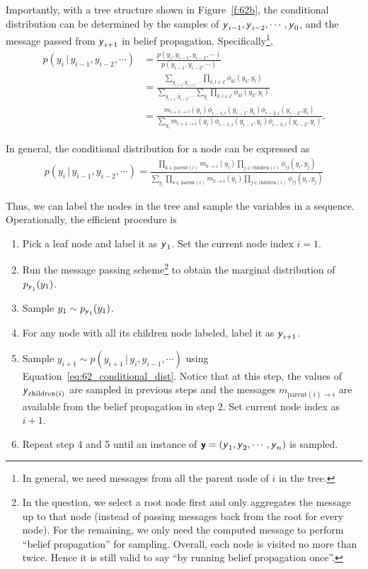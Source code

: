 \documentclass{article}
\newcommand{\s}[1]{\textsf{\textit{#1}}}
\newcommand{\bs}[1]{\textsf{\textbf{#1}}}
\begin{document}
Importantly, with a tree structure shown in Figure~\ref{f:62b}, the conditional
distribution can be determined by the samples of
$\s{y}_{i-1}, \s{y}_{i-2}, \cdots, \s{y}_{0}$, and the message passed from $\s{y}_{i+1}$
in belief propagation. Specifically\footnote{In general, we need messages from all the parent node of $i$ in the tree.},
%
\begin{align*}
	p(y_i \,\big|\, y_{i-1}, y_{i-2}, \cdots) &= \frac{p(y_i, y_{i-1}, y_{i-2}, \cdots)}{p(y_{i-1}, y_{i-2}, \cdots)}\\
	&=\frac{\sum_{y_{i+1}, y_{i+2}, \cdots} \prod_{k, l \in \mathscr{E}} \phi_{kl}(y_k, y_l)}{\sum_{y_{i+1}, y_{i+2}, \cdots}\sum_{y_{i}}\prod_{k, l \in \mathscr{E}}\phi_{kl}(y_k, y_l)} \\ 
	&= \frac{m_{i+1\to i}(y_i) \phi_{i-1, i}(y_{i-1}, y_i)\phi_{i-2, i}(y_{i-2}, y_i)}{\sum_{y_{i}}m_{i+1\to i}(y_i) \phi_{i-1, i}(y_{i-1}, y_i)\phi_{i-2, i}(y_{i-2}, y_i)}.
\end{align*}
%

In general, the conditional distribution for a node can be expressed as
\begin{align}
	p(y_i \,\big|\, y_{i-1}, y_{i-2}, \cdots) = \frac{\prod_{k \in \text{parent}(i)}m_{k\to i}(y_i)\prod_{j \in \text{children}(i)}\phi_{ij}(y_i, y_j)}{\sum_{y_{i}}\prod_{k \in \text{parent}(i)}m_{k\to i}(y_i)\prod_{j \in \text{children}(i)}\phi_{ij}(y_i, y_j)} \label{eq:62_conditional_dist}
\end{align}

Thus, we can label the nodes in the tree and sample the variables in a sequence.
%
Operationally, the efficient procedure is
\begin{enumerate}
	\item Pick a leaf node and label it as $\s{y}_1$. Set the current node index $i=1$.
	\item Run the message passing scheme\footnote{In the question, we select a root node
		  first and only aggregates the message up to that node
		  (instead of passing messages back from the root for every node).
		  For the remaining, we
		  only need the computed message to perform ``belief propagation'' for sampling.
		  Overall, each node is visited no more than twice. Hence it is still valid to say 		  ``by running belief propagation once''.}
		  to obtain the marginal distribution of $p_{\s{y}_1}(y_1)$.
	\item Sample $y_1 \sim p_{\s{y}_1}(y_1)$.
	\item For any node with all its children node labeled, label it as $\s{y}_{i+1}$.
	\item Sample $y_{i+1} \sim p(y_{i+1} \,\big|\, y_i, y_{i-1}, \cdots )$ using
		  Equation~\eqref{eq:62_conditional_dist}. Notice that at this step, the values of
		  $\s{y}_{\text{children}(i)}$ are sampled in previous steps and the messages
		  $m_{\text{parent}(i)\to i}$ are available from the belief propagation in step 2.
		  Set current node index as $i + 1$.
	\item Repeat step 4 and 5 until an instance of $\bs{y} = (\s{y}_1, \s{y}_2, \cdots, 		  \s{y}_n)$ is sampled.\\
\end{enumerate}
%
\end{document}
